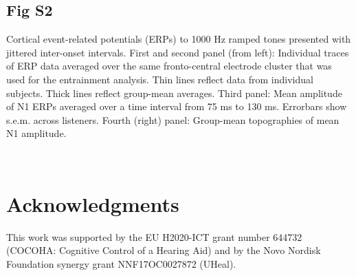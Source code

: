 \subsection*{Fig S2 }

Cortical event-\/related potentials (E\+R\+Ps) to 1000 Hz ramped tones presented with jittered inter-\/onset intervals. First and second panel (from left)\+: Individual traces of E\+RP data averaged over the same fronto-\/central electrode cluster that was used for the entrainment analysis. Thin lines reflect data from individual subjects. Thick lines reflect group-\/mean averages. Third panel\+: Mean amplitude of N1 E\+R\+Ps averaged over a time interval from 75 ms to 130 ms. Errorbars show s.\+e.\+m. across listeners. Fourth (right) panel\+: Group-\/mean topographies of mean N1 amplitude.

~\newline
 ~\newline
  ~\newline
 ~\newline


\section*{\label{_ack}%
Acknowledgments}

This work was supported by the EU H2020-\/\+I\+CT grant number 644732 (C\+O\+C\+O\+HA\+: Cognitive Control of a Hearing Aid) and by the Novo Nordisk Foundation synergy grant N\+N\+F17\+O\+C0027872 (U\+Heal). 